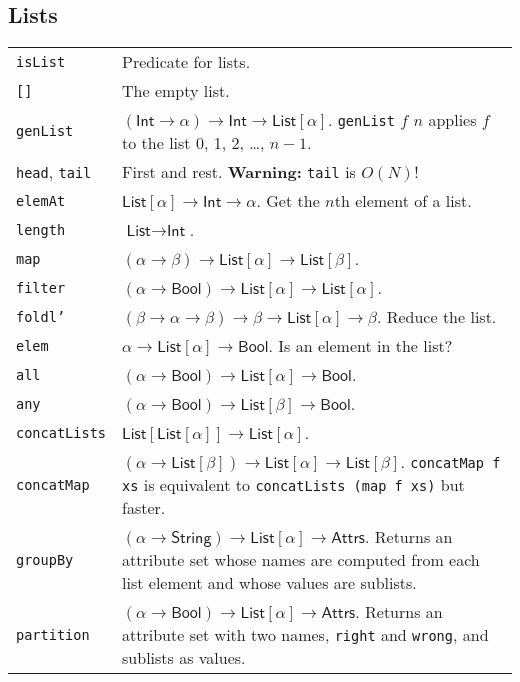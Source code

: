 \documentclass[9pt, a4paper, landscape]{extarticle}
\newcommand{\cmd}[1]{\texttt{#1}}
\newcommand{\str}{\textsf{String}}
\newcommand{\itg}{\textsf{Int}} %
\newcommand{\lst}{\textsf{List}}
\newcommand{\ats}{\textsf{Attrs}}
\newcommand{\bln}{\textsf{Bool}}
\begin{document}
\begin{multicols*}{3}
\subsection*{Lists}
\begin{tabularx}{\columnwidth}{@{}l>{\raggedright\arraybackslash}X@{}}
  \cmd{isList}      & Predicate for lists. \\
  \cmd{[]}          & The empty list. \\
  \cmd{genList}     & $(\itg\to\alpha)\to\itg\to\lst[\alpha]$.\newline
  \cmd{genList} $f$ $n$ applies $f$ to the list 0, 1, 2, \dots, $n-1$. \\

  \cmd{head}, \cmd{tail} & First and rest. \textbf{Warning:} \cmd{tail}
  is $O(N)$! \\
  \cmd{elemAt}      & $\lst[\alpha] \to \itg \to \alpha$. Get the $n$th element of a list. \\
  \cmd{length}      & $\lst \to \itg$. \\
  
  \cmd{map}         & $(\alpha\to\beta)\to\lst[\alpha]\to\lst[\beta]$. \\
  \cmd{filter}      & $(\alpha\to\bln)\to\lst[\alpha]\to\lst[\alpha]$. \\
  \cmd{foldl'}      & $(\beta\to\alpha\to\beta)\to\beta\to\lst[\alpha]\to\beta$. Reduce the list.\\
  
  \cmd{elem}        & $\alpha\to\lst[\alpha]\to\bln$. Is an element in the list? \\
  \cmd{all}         & $(\alpha \to \bln) \to \lst[\alpha] \to \bln$. \\
  \cmd{any}         & $(\alpha \to \bln) \to \lst[\beta] \to \bln$. \\ 
  
  \cmd{concatLists} & $\lst[\lst[\alpha]]\to\lst[\alpha]$.\\
  \cmd{concatMap}   & $(\alpha\to\lst[\beta])\to\lst[\alpha]\to\lst[\beta]$. \cmd{concatMap f
    xs} is equivalent to \cmd{concatLists (map f xs)} but faster. \\

  \cmd{groupBy}     & $(\alpha\to\str)\to\lst[\alpha]\to\ats$. Returns an attribute
  set whose names are computed from each list element and whose values
  are sublists. \\
  \cmd{partition}   & $(\alpha\to\bln)\to\lst[\alpha]\to\ats$. Returns an attribute set
  with two names, \cmd{right} and \cmd{wrong}, and sublists as values. \\


\end{tabularx}
\end{multicols*}
\end{document}
